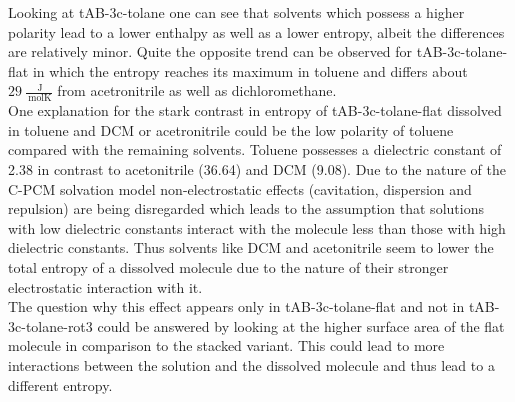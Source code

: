 %
Looking at tAB-3c-tolane one can see that solvents which possess a higher polarity lead to a lower enthalpy as well as a lower entropy, albeit the differences are relatively minor. Quite the opposite trend can be observed for tAB-3c-tolane-flat in which the entropy reaches its maximum in toluene and differs about $\SI{29}{\frac{\SI{}{\joule}}{\SI{}{\mole\kelvin}}}$ from acetronitrile as well as dichloromethane. \\ One explanation for the stark contrast in entropy of tAB-3c-tolane-flat dissolved in toluene and DCM or acetronitrile could be the low polarity of toluene compared with the remaining solvents. Toluene possesses a dielectric constant of 2.38 in contrast to acetonitrile (36.64) and DCM (9.08).\cite{Dieelectric-constants} Due to the nature of the C-PCM solvation model non-electrostatic effects (cavitation, dispersion and repulsion) are being disregarded which leads to the assumption that solutions with low dielectric constants interact with the molecule less than those with high dielectric constants. Thus solvents like DCM and acetonitrile seem to lower the total entropy of a dissolved molecule due to the nature of their stronger electrostatic interaction with it. \\The question why this effect appears only in tAB-3c-tolane-flat and not in tAB-3c-tolane-rot3 could be answered by looking at the higher surface area of the flat molecule in comparison to the stacked variant. This could lead to more interactions between the solution and the dissolved molecule and thus lead to a different entropy.
%
%
%

